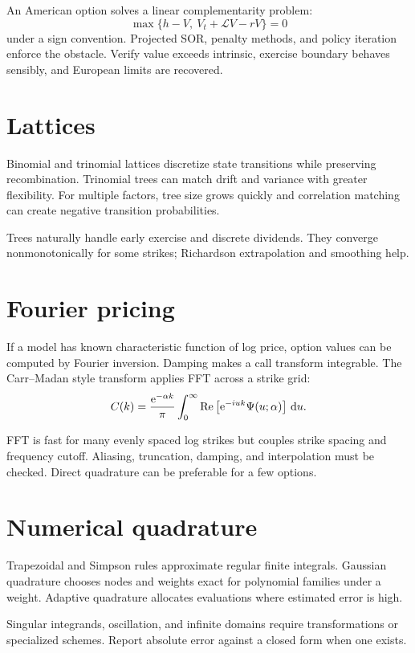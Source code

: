 An American option solves a linear complementarity problem:
\[
\max\{h-V,\ V_t+\mathcal LV-rV\}=0
\]
under a sign convention. Projected SOR, penalty methods, and policy iteration enforce
the obstacle. Verify value exceeds intrinsic, exercise boundary behaves sensibly,
and European limits are recovered.

\section{Lattices}

Binomial and trinomial lattices discretize state transitions while preserving
recombination. Trinomial trees can match drift and variance with greater flexibility.
For multiple factors, tree size grows quickly and correlation matching can create
negative transition probabilities.

Trees naturally handle early exercise and discrete dividends. They converge
nonmonotonically for some strikes; Richardson extrapolation and smoothing help.

\section{Fourier pricing}

If a model has known characteristic function of log price, option values can be
computed by Fourier inversion. Damping makes a call transform integrable. The
Carr--Madan style transform applies FFT across a strike grid:
\[
C(k)=\frac{\mathrm e^{-\alpha k}}{\pi}
\int_0^\infty
\operatorname{Re}\left[
\mathrm e^{-iuk}\Psi(u;\alpha)
\right]\,\mathrm d u.
\]

FFT is fast for many evenly spaced log strikes but couples strike spacing and
frequency cutoff. Aliasing, truncation, damping, and interpolation must be checked.
Direct quadrature can be preferable for a few options.

\section{Numerical quadrature}

Trapezoidal and Simpson rules approximate regular finite integrals. Gaussian
quadrature chooses nodes and weights exact for polynomial families under a weight.
Adaptive quadrature allocates evaluations where estimated error is high.

Singular integrands, oscillation, and infinite domains require transformations or
specialized schemes. Report absolute error against a closed form when one exists.

